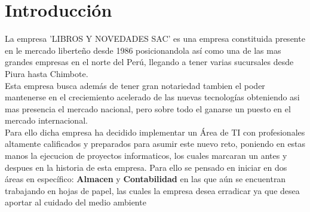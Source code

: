 \documentclass[12pt,a4paper]{article}
\begin{document}
\begin{justify}
\begin{abstract}
La empresa 'LIBROS Y NOVEDADES SAC.' es una empresa dedicada al rubro de la venta de libros y art\'iculos de escritorio, consolidandose como una de las mejores empresas en el rubro dentro del norte de pa\'is\\[0.4cm]
Actualmente la empresa presenta problemas con el control de ingresos y salidas de productos el cual le ha tra\'ido diferentes problemas al momento de revisar sus libros contables.\\[0.4cm]
El objetivo principal de este proyecto es el centranos en implementar un software el cual permita llevar un mejor control tanto de los ingresos de productos como de las ventas registradas en el sistema durante el d\'ia a d\'ia.
\end{abstract}
\end{justify}
\newpage



\tableofcontents
{}
\newpage
\setcounter{page}{1}

\pagestyle{fancy}
\fancyhf{}
\cfoot{\thepage}
\section{Introducci\'on}\label{sec:intro}

La empresa 'LIBROS Y NOVEDADES SAC' es una empresa constituida presente en le mercado liberte\~no desde 1986 posicionandola as\'i como una de las mas grandes empresas en el norte del Per\'u, llegando a tener varias sucursales desde Piura hasta Chimbote.\\[0.4cm]
Esta empresa busca adem\'as de tener gran notariedad tambien el poder mantenerse en el creciemiento acelerado de las nuevas tecnolog\'ias obteniendo asi mas presencia el mercado nacional, pero sobre todo el ganarse un puesto en el mercado internacional.\\[0.4cm]
Para ello dicha empresa ha decidido implementar un \'Area de TI con profesionales altamente calificados y preparados para asumir este nuevo reto, poniendo en estas manos la ejecucion de proyectos informaticos, los cuales marcaran un antes y despues en la historia de esta empresa. Para ello se pensado en iniciar en dos \'areas en espec\'ifico: \textbf{Almacen} y \textbf{Contabilidad} en las que a\'un se encuentran trabajando en hojas de papel, las cuales la empresa desea erradicar ya que desea aportar al cuidado del medio ambiente
\end{document}
